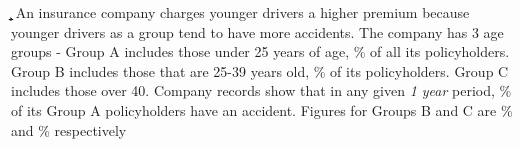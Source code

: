 


\FRACADD{}\a\b
{}\a\b\c\d

\question 
An insurance company charges younger drivers a higher premium because younger drivers 
as a group tend to have more accidents. The company has 3 age groups - Group A includes those
under 25 years of age, \va\% of all its policyholders. Group B includes those that are 25-39 years
old,  \vb\% of its policyholders. Group C includes those over 40. Company 
records show that in any given \textit{1 year} period, \vc\% of its Group A policyholders have 
an accident. Figures for Groups B and C are \vd\% and \ve\% respectively

\watchout[-80pt]

\ifprintanswers
\fi 

